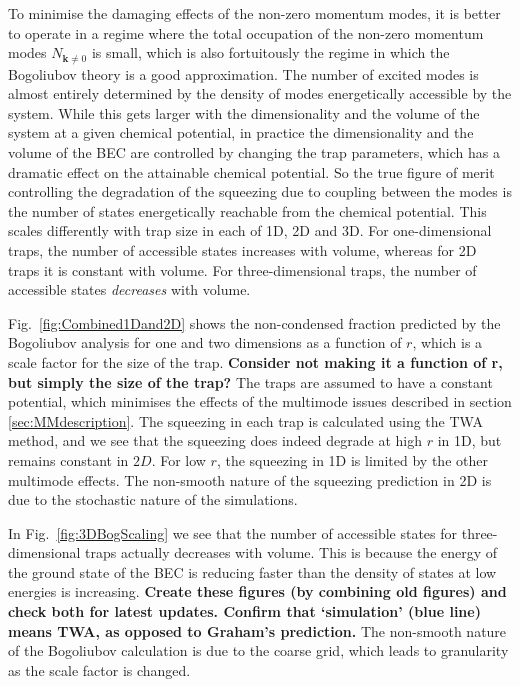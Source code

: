 \documentclass{iopart}
\begin{document}
To minimise the damaging effects of the non-zero momentum modes, it is better to operate in a regime where the total occupation of the non-zero momentum modes $N_{\mathbf{k}\neq 0}$ is small, which is also fortuitously the regime in which the Bogoliubov theory is a good approximation.  
The number of excited modes is almost entirely determined by the density of modes energetically accessible by the system.  While this gets larger with the dimensionality and the volume of the system at a given chemical potential, in practice the dimensionality and the volume of the BEC are controlled by changing the trap parameters, which has a dramatic effect on the attainable chemical potential.  So the true figure of merit controlling the degradation of the squeezing due to coupling between the modes is the number of states energetically reachable from the chemical potential.  This scales differently with trap size in each of 1D, 2D and 3D.  For one-dimensional traps, the number of accessible states increases with volume, whereas for 2D traps it is constant with volume. For three-dimensional traps, the number of accessible states \emph{decreases} with volume.

Fig.~\ref{fig:Combined1Dand2D} shows the non-condensed fraction predicted by the Bogoliubov analysis for one and two dimensions as a function of $r$, which is a scale factor for the size of the trap.  \textbf{Consider not making it a function of r, but simply the size of the trap?}  The traps are assumed to have a constant potential, which minimises the effects of the multimode issues described in section \ref{sec:MMdescription}.  The squeezing in each trap is calculated using the TWA method, and we see that the squeezing does indeed degrade at high $r$ in 1D, but remains constant in $2D$.  For low $r$, the squeezing in 1D is limited by the other multimode effects.  The non-smooth nature of the squeezing prediction in 2D is due to the stochastic nature of the simulations.

In Fig.~\ref{fig:3DBogScaling} we see that the number of accessible states for three-dimensional traps actually decreases with volume.  This is because the energy of the ground state of the BEC is reducing faster than the density of states at low energies is increasing.  \textbf{Create these figures (by combining old figures) and check both for latest updates.  Confirm that `simulation' (blue line) means TWA, as opposed to Graham's prediction.}  The non-smooth nature of the Bogoliubov calculation is due to the coarse grid, which leads to granularity as the scale factor is changed.  
\end{document}
